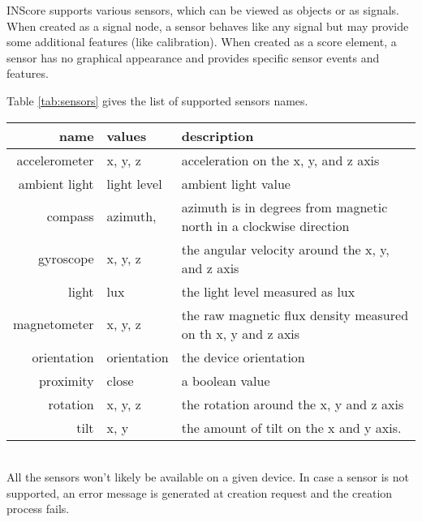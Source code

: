 


\label{sensors}

INScore supports various sensors, which can be viewed as objects or as signals. When created as a signal node, a sensor behaves like any signal but may provide some additional features (like calibration). When created as a score element, a sensor has no graphical appearance and provides specific sensor events and features.

Table \ref{tab:sensors} gives the list of supported sensors names.

\begin{table*}[htbp]
\begin{center}
\begin{tabular}{rll}
\hline
name & values		&	description \\
\hline
accelerometer	& x, y, z			& acceleration on the x, y, and z axis \\
ambient light	& light level		& ambient light value \\
compass			& azimuth,  		& azimuth is in degrees from magnetic north in a clockwise direction \\
gyroscope		& x, y, z			& the angular velocity around the x, y, and z axis\\
light			& lux				& the light level measured as lux\\
magnetometer	& x, y, z			& the raw magnetic flux density measured on th x, y and z axis\\
orientation		& orientation		& the device orientation \\
proximity		& close				& a boolean value \\
rotation		& x, y, z			& the rotation around the x, y and z axis \\
tilt			& x, y 				& the amount of tilt on the x and y axis.\\
\hline
\end{tabular}
\end{center}
\label{tab:sensors}
\caption{Sensors names and description}

\end{table*}

\note\\
All the sensors won't likely be available on a given device. In case a sensor is not supported, an error message is generated at creation request and the creation process fails.



